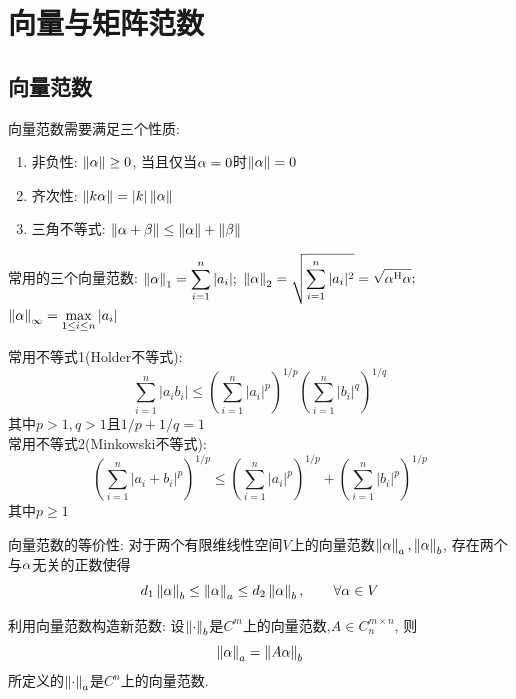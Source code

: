 \documentclass{matrix-review}
\begin{document}
\section{向量与矩阵范数}

\subsection{向量范数}
向量范数需要满足三个性质:
\begin{enumerate}
    \item 非负性: $\left\lVert \alpha \right\rVert\ge 0$, 当且仅当$\alpha=0$时$\left\lVert \alpha \right\rVert=0$
    \item 齐次性: $\left\lVert k\alpha \right\rVert=|k|\left\lVert \alpha \right\rVert$
    \item 三角不等式: $\left\lVert \alpha+\beta \right\rVert\le\left\lVert \alpha \right\rVert+\left\lVert \beta \right\rVert$
\end{enumerate}
常用的三个向量范数: $\left\lVert \alpha \right\rVert_1=\displaystyle\sum_{i=1}^{n}|a_i|;$
$\left\lVert \alpha \right\rVert_2=\displaystyle\sqrt{\sum_{i=1}^{n}|a_i|^2}=\sqrt{\alpha^{\mathrm{H}}\alpha};$
$\left\lVert \alpha \right\rVert_\infty=\displaystyle\max_{1\le i\le n}|a_i|$

\begin{remarkbox}
    常用不等式1(Holder不等式):\begin{equation*}
        \sum_{i=1}^{n}|a_ib_i|\le\left(\sum_{i=1}^{n}\left|a_i\right|^p\right)^{1/p}\left(\sum_{i=1}^{n}\left|b_i\right|^q\right)^{1/q}
    \end{equation*}其中$p>1,q>1$且$1/p+1/q=1$\\[1em]
    常用不等式2(Minkowski不等式):\begin{equation*}
        \left(\sum_{i=1}^{n}\left|a_i+b_i\right|^p\right)^{1/p}\le\left(\sum_{i=1}^{n}\left|a_i\right|^p\right)^{1/p}+\left(\sum_{i=1}^{n}\left|b_i\right|^p\right)^{1/p}
    \end{equation*}其中$p\ge1$
\end{remarkbox}

向量范数的等价性: 对于两个有限维线性空间$V$上的向量范数$\left\lVert \alpha \right\rVert_a,\left\lVert \alpha \right\rVert_b$, 存在两个与$\alpha$无关的正数使得\begin{equation*}
    d_1\left\lVert \alpha \right\rVert_b\le \left\lVert \alpha \right\rVert_a\le d_2\left\lVert \alpha \right\rVert_b, \qquad \forall \alpha\in V
\end{equation*}

利用向量范数构造新范数: 设$\left\lVert \cdot \right\rVert_b$是$C^m$上的向量范数,$A\in C^{m\times n}_n$, 则\begin{equation*}
    \left\lVert \alpha \right\rVert_a = \left\lVert A\alpha \right\rVert_b
\end{equation*}所定义的$\left\lVert \cdot \right\rVert_a$是$C^n$上的向量范数.
\end{document}
